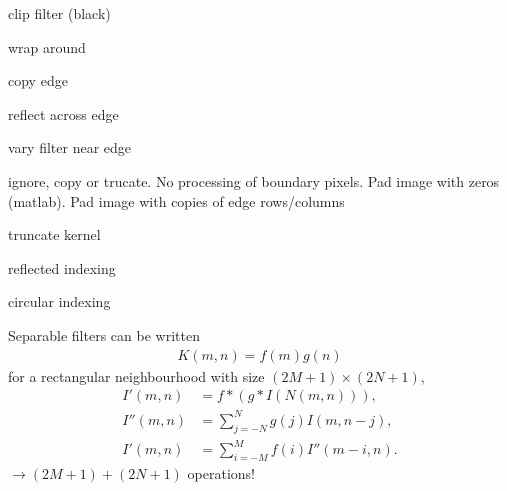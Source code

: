 \begin{compactdesc}
		\begin{inparaenum}[\itshape(1)]
			\item clip filter (black)
			\item wrap around
			\item copy edge
			\item reflect across edge
			\item vary filter near edge
		\end{inparaenum}
	\item[\lp{Filter at boundary}]
		\begin{inparaenum}[\itshape(1)]
			\item ignore, copy or trucate. No processing of boundary pixels. Pad image with zeros (matlab). Pad image with copies of edge rows/columns
			\item truncate kernel
			\item reflected indexing
			\item circular indexing
		\end{inparaenum}
	\item[\lp{Separable Kernels}] Separable filters can be written 
		\begin{gather*}
			K(m,n)=f(m)g(n)
		\end{gather*}
		for a rectangular neighbourhood with size $(2M+1)\times (2N+1)$,
		\begin{align*}
			I'(m,n)&=f*(g*I(N(m,n))),\\
			I''(m,n)&={\scriptstyle\sum}_{j=-N}^{N}g(j)I(m,n-j),\\
			I'(m,n)&={\scriptstyle\sum}_{i=-M}^{M}f(i)I''(m-i,n).
		\end{align*}
		$\to (2M+1)+(2N+1)$ operations!
	\item[\lp{Smoothing kernels (low-pass filters)}] 
\end{compactdesc}

